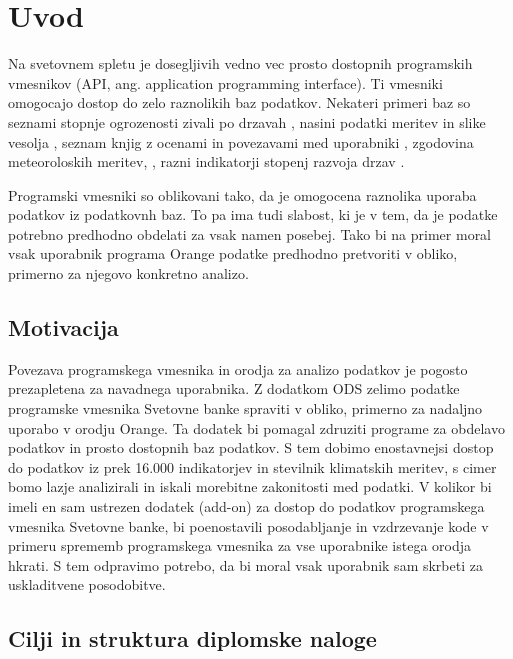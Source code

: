 
\chapter{Uvod}

Na svetovnem spletu je dosegljivih vedno vec prosto dostopnih programskih
vmesnikov (API, ang. application programming interface). Ti vmesniki omogocajo dostop
do zelo raznolikih baz podatkov. Nekateri primeri baz so                          
seznami stopnje ogrozenosti zivali po drzavah ,    
nasini podatki meritev in slike vesolja  ,
seznam knjig z ocenami in povezavami med uporabniki ,
zgodovina meteoroloskih meritev, ,
razni indikatorji stopenj razvoja drzav .

Programski vmesniki so oblikovani tako, da je omogocena raznolika uporaba 
podatkov iz podatkovnh baz. To pa ima tudi slabost, ki je v tem, da je podatke 
potrebno predhodno obdelati za vsak namen posebej. Tako bi na primer moral vsak
uporabnik programa Orange podatke predhodno pretvoriti v obliko, primerno za 
njegovo konkretno analizo.


\section{Motivacija}

Povezava programskega vmesnika in orodja za analizo podatkov je pogosto    
prezapletena za navadnega uporabnika. Z dodatkom ODS zelimo podatke
programske vmesnika Svetovne banke spraviti v obliko, primerno za nadaljno 
uporabo v orodju Orange. Ta dodatek bi pomagal zdruziti programe za obdelavo 
podatkov in prosto dostopnih baz podatkov. S tem dobimo enostavnejsi dostop do
podatkov iz prek 16.000 indikatorjev in stevilnik klimatskih meritev, 
s cimer bomo lazje analizirali in iskali morebitne zakonitosti med podatki.
V kolikor bi imeli en sam ustrezen dodatek (add-on) za dostop do podatkov 
programskega vmesnika Svetovne banke, bi poenostavili posodabljanje in 
vzdrzevanje kode v primeru sprememb programskega vmesnika za vse uporabnike
istega orodja hkrati. S tem odpravimo potrebo, da bi moral vsak uporabnik sam
skrbeti za uskladitvene posodobitve.


\section{Cilji in struktura diplomske naloge}


